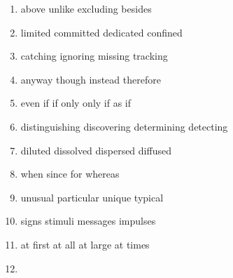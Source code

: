 {\begin{enumerate}
\fourchoices
{although}
{as}
{but}
{while}




\item


\fourchoices
{above}
{unlike}
{excluding}
{besides}




\item


\fourchoices
{limited}
{committed}
{dedicated}
{confined}




\item


\fourchoices
{catching}
{ignoring}
{missing}
{tracking}




\item


\fourchoices
{anyway}
{though}
{instead}
{therefore}




\item


\fourchoices
{even if}
{if only}
{only if}
{as if}




\item

\fourchoices
{distinguishing}
{discovering}
{determining}
{detecting}


\item


\fourchoices
{diluted}
{dissolved}
{dispersed}
{diffused}




\item


\fourchoices
{when}
{since}
{for}
{whereas}




\item


\fourchoices
{unusual}
{particular}
{unique}
{typical}




\item


\fourchoices
{signs}
{stimuli}
{messages}
{impulses}




\item


\fourchoices
{at first}
{at all}
{at large}
{at times}




\item



\end{enumerate}}
